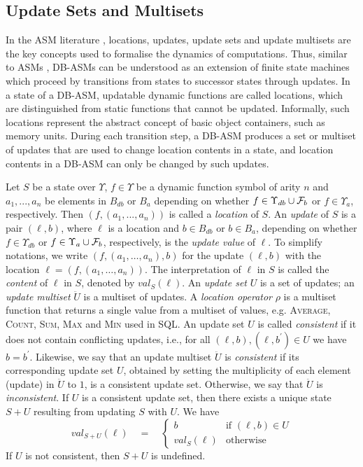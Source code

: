 \documentclass[preprint,11pt]{elsarticle}
\theoremstyle{definition}
\theoremstyle{remark}
\begin{document}
\subsection{Update Sets and Multisets}\label{usetsandmultisets}
In the ASM literature \cite{boerger:2003}, locations, updates, update sets and update multisets are the key concepts used to formalise the dynamics of computations. Thus, similar to ASMs \cite{boerger:2003}, DB-ASMs can be understood as an extension of finite state machines which proceed by transitions from states to successor states through updates. In a state of a DB-ASM, updatable dynamic functions are called locations, which are distinguished from static functions that cannot be updated. Informally, such locations represent the abstract concept of basic object containers, such as memory units. During each transition step, a DB-ASM produces a set or multiset of updates that are used to change location contents in a state, and location contents in a DB-ASM can only be changed by such updates.

Let $S$ be a state over $\Upsilon$, $f\in\Upsilon$ be a dynamic function symbol of
arity $n$ and $a_1,...,a_n$ be elements in $B_{db}$ or $B_a$ depending on whether $f \in \Upsilon_{db} \cup {\cal F}_b$ or $f \in \Upsilon_{a}$, respectively.
Then $(f,(a_1,...,a_n))$ is called a {\em location} of $S$. An
\emph{update} of $S$ is a pair $(\ell,b)$, where $\ell$ is a
location and $b \in B_{db}$ or $b \in B_a$, depending on whether $f \in \Upsilon_{db}$ or $f \in \Upsilon_{a} \cup {\cal F}_b$, respectively, is the \emph{update value} of $\ell$. To simplify notations, we write $(f
,(a_1,\dots,a_n),b)$ for the update $(\ell,b)$ with the location $\ell = (f,(a_1,\dots,a_n))$. The
interpretation of $\ell$ in $S$ is called the \emph{content} of
$\ell$ in $S$, denoted by $val_{S}(\ell)$. An \emph{update set}
$U$ is a set of updates; an \emph{update multiset}
$\ddot{U}$ is a multiset of updates. A \emph{location operator}
$\rho$ is a multiset function that returns a
single value from a multiset of values, e.g. \textsc{Average},
\textsc{Count}, \textsc{Sum}, \textsc{Max} and \textsc{Min} used in
SQL. An update set $U$ is called \emph{consistent} if it does
not contain conflicting updates, i.e., for all $(\ell,b),
(\ell,b^\prime) \in U$ we have $b = b^\prime$. Likewise, we say that an update multiset $\ddot{U}$ is \emph{consistent} if its corresponding update set $U$, obtained by setting the multiplicity of each element (update) in $\ddot{U}$ to $1$, is a consistent update set. Otherwise, we say that $\ddot{U}$ is \emph{inconsistent}.
If $U$ is a consistent update set, then
there exists a unique state $S + U$ resulting from
updating $S$ with $U$. We have
\[ val_{S + U}(\ell) \quad = \quad \begin{cases}
b &\text{if } (\ell,b) \in U \\
val_S(\ell) &\text{otherwise} \end{cases} \]
If $U$ is not consistent, then $S+U$ is undefined.
\end{document}
